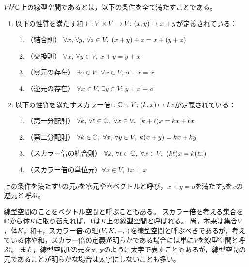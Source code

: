 \documentclass[a4paper,draft]{ltjsarticle}
\begin{document}
\begin{defi}[線型空間]
    $V$が$\mathbb{C}$上の線型空間であるとは，以下の条件を全て満たすことである。
    \begin{enumerate}[label=(\arabic*)]
        \item 以下の性質を満たす和$+:V\times V\to V;\, \pare{{x},{y}}\mapsto {x}+{y}$が定義されている：
        \begin{enumerate}[label = (\roman*)]
            \item （結合則） $\forall {x},\, \forall {y},\, \forall {z} \in V, \
            \pare{{x} + {y}} + {z} = {x} + \pare{{y} + {z}}$
            \item （交換則） $\forall {x},\, \forall {y} \in V, \ {x} + {y} = {y} + {x}$
            \item （零元の存在） $\exists {o} \in V;\ \forall {x} \in V, \ {o} + {x} = {x}$
            \item （逆元の存在） $\forall {x}\in V,\, \exists {y}\in V;\ {y} + {x} = {o}$
        \end{enumerate}

        \item 以下の性質を満たすスカラー倍$\cdot\colon \CC \times V;\, \pare{k, {x}} \mapsto k{x}$が定義されている：
        \begin{enumerate}[resume,label = (\roman*)]
            \item （第一分配則） $\forall k,\, \forall \ell \in \CC, \ \forall {x} \in V, \ \pare{k + \ell} {x} = k{x} + \ell{x}$
            \item （第二分配則） $\forall k \in \CC, \ \forall {x},\, \forall {y}\in V, \ k\pare{{x} + {y}} = k{x} + k{y}$
            \item （スカラー倍の結合則） $\forall k,\, \forall \ell\in\CC, \ \forall {x}\in V, \ \pare{k\ell}{x} = k\pare{\ell{x}}$
            \item （スカラー倍の単位元）$\forall {x} \in V, \ 1{x} = {x}$
        \end{enumerate}
    \end{enumerate}

    上の条件を満たす$V$の元${o}$を零元や零ベクトルと呼び，${x}+{y}={o}$を満たす${y}$を${x}$の逆元と呼ぶ。
\end{defi}

\begin{rem}
    線型空間のことをベクトル空間と呼ぶこともある。
    スカラー倍を考える集合を$\mathbb{C}$から体$K$に取り替えれば，$V$は$K$上の線型空間と呼ばれる。
    尚，本来は集合$V$，体$K$，和$+$，スカラー倍$\cdot $の組$\pare{V,K,+,\cdot}$を線型空間と呼ぶべきであるが，考えている体や和，スカラー倍の定義が明らかである場合には単に$V$を線型空間と呼ぶ。
    また，線型空間$V$の元を$\bm{x}$, $\bm{y}$のように太字で表すこともあるが，線型空間の元であることが明らかな場合は太字にしないことも多い。
\end{rem}
\end{document}
